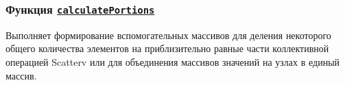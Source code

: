 \subsubsection*{Функция \href{group__MPIWorker.html#ga6fd8303c1b4e39a4a623756fdcbeae6f}{\tt calculate\-Portions}}

Выполняет формирование вспомогательных массивов для деления некоторого общего количества элементов на приблизительно равные части коллективной операцией Scatterv или для объединения массивов значений на узлах в единый массив. 